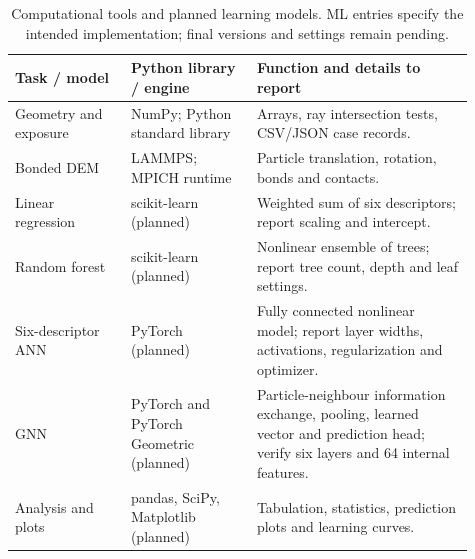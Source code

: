 \begin{table}[htbp]
\centering\small
\caption{Computational tools and planned learning models. ML entries specify the intended implementation; final versions and settings remain pending.}\label{tab:software}
\begin{tabular}{@{}p{0.23\linewidth}p{0.25\linewidth}p{0.43\linewidth}@{}}\toprule
Task / model & Python library / engine & Function and details to report\\\midrule
Geometry and exposure & NumPy; Python standard library & Arrays, ray intersection tests, CSV/JSON case records.\\
Bonded DEM & LAMMPS; MPICH runtime & Particle translation, rotation, bonds and contacts.\\
Linear regression & scikit-learn (planned) & Weighted sum of six descriptors; report scaling and intercept.\\
Random forest & scikit-learn (planned) & Nonlinear ensemble of trees; report tree count, depth and leaf settings.\\
Six-descriptor ANN & PyTorch (planned) & Fully connected nonlinear model; report layer widths, activations, regularization and optimizer.\\
GNN & PyTorch and PyTorch Geometric (planned) & Particle-neighbour information exchange, pooling, learned vector and prediction head; verify six layers and 64 internal features.\\
Analysis and plots & pandas, SciPy, Matplotlib (planned) & Tabulation, statistics, prediction plots and learning curves.\\\bottomrule
\end{tabular}
\end{table}
